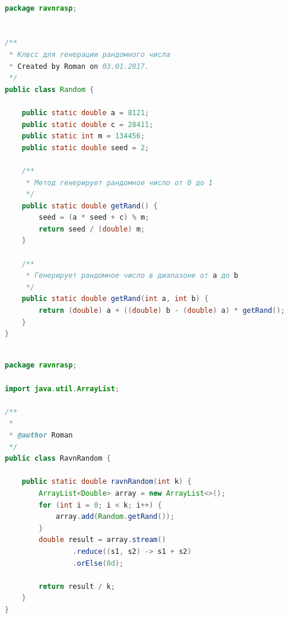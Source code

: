 \documentclass[a4paper,12pt]{article}
\begin{document}
\begin{lstlisting}[language=Java, title=Генератор случайных чисел из прошлой работы]

package ravnrasp;


/**
 * Клвсс для генерации рандомного числа
 * Created by Roman on 03.01.2017.
 */
public class Random {

    public static double a = 8121;
    public static double c = 28411;
    public static int m = 134456;
    public static double seed = 2;

    /**
     * Метод генерирует рандомное число от 0 до 1
     */
    public static double getRand() {
        seed = (a * seed + c) % m;
        return seed / (double) m;
    }

    /**
     * Генерирует рандомное число в диапазоне от a до b
     */
    public static double getRand(int a, int b) {
        return (double) a + ((double) b - (double) a) * getRand();
    }
}
\end{lstlisting}

\begin{lstlisting}[language=Java, title=Генератор случайных чисел]

package ravnrasp;

import java.util.ArrayList;

/**
 *
 * @author Roman
 */
public class RavnRandom {

    public static double ravnRandom(int k) {
        ArrayList<Double> array = new ArrayList<>();
        for (int i = 0; i < k; i++) {
            array.add(Random.getRand());
        }
        double result = array.stream()
                .reduce((s1, s2) -> s1 + s2)
                .orElse(0d);
        
        return result / k;
    }
}
\end{lstlisting}
\end{document}

